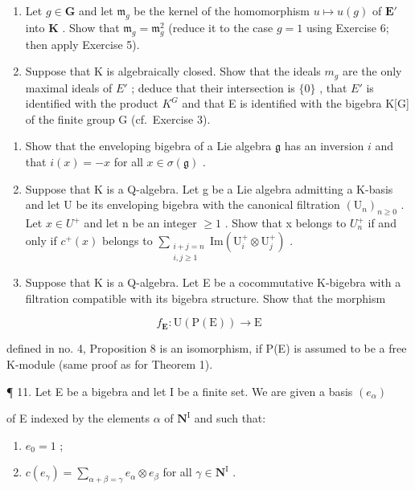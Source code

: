 \begin{enumerate}
\def\labelenumi{(\alph{enumi})}
\item
  Let \(g \in \mathbf{G}\) and let \(\mathfrak{m}_g\) be the kernel of the homomorphism \(u \mapsto u(g)\) of \(\mathbf{E}'\) into \(\mathbf{K}\) . Show that \(\mathfrak{m}_g = \mathfrak{m}_g^2\) (reduce it to the case \(g = 1\) using Exercise 6; then apply Exercise 5).
\item
  Suppose that K is algebraically closed. Show that the ideals \(m_{g}\) are the only maximal ideals of \(E'\) ; deduce that their intersection is \(\{0\}\) , that \(E'\) is identified with the product \(K^{G}\) and that E is identified with the bigebra K[G] of the finite group G (cf.~Exercise 3).
\end{enumerate}

\begin{enumerate}
\def\labelenumi{\arabic{enumi}.}
\setcounter{enumi}{7}
\item
  Show that the enveloping bigebra of a Lie algebra \(\mathfrak{g}\) has an inversion \(i\) and that \(i(x) = -x\) for all \(x \in \sigma(\mathfrak{g})\) .
\item
  Suppose that K is a Q-algebra. Let g be a Lie algebra admitting a K-basis and let U be its enveloping bigebra with the canonical filtration \((\mathrm{U}_{n})_{n\geqslant0}\) . Let \(x\in U^{+}\) and let n be an integer \(\geqslant1\) . Show that x belongs to \(U_{n}^{+}\) if and only if \(c^{+}(x)\) belongs to \(\sum_{\substack{i+j=n\\ i,j\geqslant1}}\mathrm{Im}(\mathrm{U}_{i}^{+}\otimes\mathrm{U}_{j}^{+})\) .
\item
  Suppose that K is a Q-algebra. Let E be a cocommutative K-bigebra with a filtration compatible with its bigebra structure. Show that the morphism
\end{enumerate}

\[
f _ {\mathbf {E}} \colon \mathrm{U} (\mathrm{P} (\mathrm{E})) \rightarrow \mathrm{E}
\]

defined in no. 4, Proposition 8 is an isomorphism, if P(E) is assumed to be a free K-module (same proof as for Theorem 1).

¶ 11. Let E be a bigebra and let I be a finite set. We are given a basis \((e_{\alpha})\)

of E indexed by the elements \(\alpha\) of \(\mathbf{N}^{\mathrm{I}}\) and such that:

\begin{enumerate}
\def\labelenumi{(\roman{enumi})}
\item
  \(e_{0} = 1\) ;
\item
  \(c(e_{\gamma}) = \sum_{\alpha + \beta = \gamma} e_{\alpha} \otimes e_{\beta}\) for all \(\gamma \in \mathbf{N}^{\mathrm{I}}\) .
\end{enumerate}

